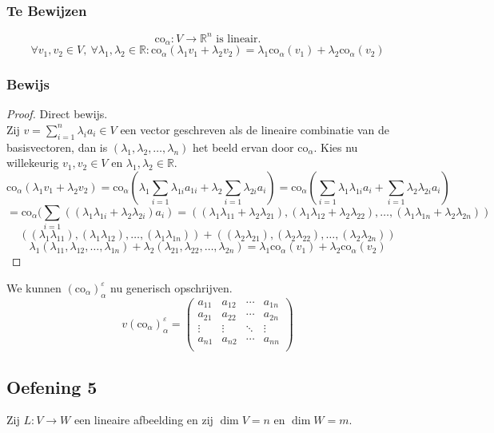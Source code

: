 \documentclass[lineaire_algebra_oplossingen.tex]{subfiles}
\begin{document}
\subsubsection*{Te Bewijzen}
\[\text{co}_\alpha:V\rightarrow \mathbb{R}^n \text{ is lineair.}\]
\[
\forall v_1,v_2 \in V ,\ \forall\lambda_1,\lambda_2\in \mathbb{R}: \text{co}_\alpha(\lambda_1v_1+\lambda_2v_2)=\lambda_1\text{co}_\alpha(v_1)
+\lambda_2\text{co}_\alpha(v_2)
\]
\subsubsection*{Bewijs}
\begin{proof}
Direct bewijs.\\
Zij $v = \sum_{i=1}^n\lambda_ia_i \in V$ een vector geschreven als de lineaire combinatie van de basisvectoren, dan is $(\lambda_1,\lambda_2,\ldots,\lambda_n)$ het beeld ervan door $\text{co}_\alpha$.
Kies nu willekeurig $v_1,v_2 \in V$ en $\lambda_1,\lambda_2\in \mathbb{R}$.
\[
\text{co}_\alpha(\lambda_1v_1+\lambda_2v_2)= \text{co}_\alpha(\lambda_1\sum_{i=1}\lambda_{1i}a_{1i} + \lambda_2\sum_{i=1}\lambda_{2i}a_{i}) = \text{co}_\alpha(\sum_{i=1}\lambda_1\lambda_{1i}a_{i} + \sum_{i=1}\lambda_2\lambda_{2i}a_{i})
\]
\[
= \text{co}_\alpha(\sum_{i=1}((\lambda_1\lambda_{1i}+\lambda_2\lambda_{2i})a_{i}) = ((\lambda_1\lambda_{11}+\lambda_2\lambda_{21}),(\lambda_1\lambda_{12}+\lambda_2\lambda_{22}),\ldots,(\lambda_1\lambda_{1n}+\lambda_2\lambda_{2n}))
\]
\[
((\lambda_1\lambda_{11}),(\lambda_1\lambda_{12}),\ldots,(\lambda_1\lambda_{1n}))+((\lambda_2\lambda_{21}),(\lambda_2\lambda_{22}),\ldots,(\lambda_2\lambda_{2n}))
\]
\[
\lambda_1(\lambda_{11},\lambda_{12},\ldots,\lambda_{1n})+ \lambda_2(\lambda_{21},\lambda_{22},\ldots,\lambda_{2n}) = \lambda_1\text{co}_\alpha(v_1)+\lambda_2\text{co}_\alpha(v_2)
\]
\end{proof}
We kunnen $(\text{co}_\alpha)_\alpha^\varepsilon$ nu generisch opschrijven.
\[
v(\text{co}_\alpha)_\alpha^\varepsilon = 
\begin{pmatrix}
a_{11} & a_{12} & \cdots & a_{1n}\\
a_{21} & a_{22} & \cdots & a_{2n}\\
\vdots & \vdots & \ddots & \vdots\\
a_{n1} & a_{n2} & \cdots & a_{nn}\\
\end{pmatrix}
\]

\subsection{Oefening 5}
Zij $L:V \rightarrow W$ een lineaire afbeelding en zij $\dim V = n$ en $\dim W = m$.
\end{document}

